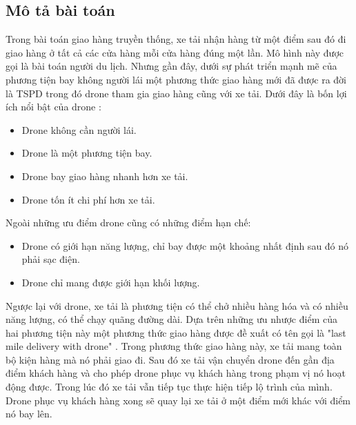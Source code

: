 \documentclass[a4paper,12pt]{report}
\begin{document}
\subsection{Mô tả bài toán}
Trong bài toán giao hàng truyền thống, xe tải nhận hàng từ một điểm sau đó đi giao hàng ở tất cả các cửa hàng mỗi cửa hàng đúng một lần. Mô hình này được gọi là bài toán người du lịch. Nhưng gần đây, dưới sự phát triển mạnh mẽ của phương tiện bay không người lái một phương thức giao hàng mới đã được ra đời là \ac{TSPD} trong đó drone tham gia giao hàng cũng với xe tải. Dưới đây là bốn lợi ích nổi bật của drone \cite{main} :
\begin{itemize}
\item Drone không cần người lái.
\item Drone là một phương tiện bay.
\item Drone bay giao hàng nhanh hơn xe tải.
\item Drone tốn ít chi phí hơn xe tải.
\end{itemize}

Ngoài những ưu điểm drone cũng có những điểm hạn chế:

\begin{itemize}
\item Drone có giới hạn năng lượng, chỉ bay được một khoảng nhất định sau đó nó phải sạc điện.
\item Drone chỉ mang được giới hạn khối lượng.
\end{itemize}

Ngược lại với drone, xe tải là phương tiện có thể chở nhiều hàng hóa và có nhiều năng lượng, có thể chạy quãng đường dài. Dựa trên những ưu nhược điểm của hai phương tiện này một phương thức giao hàng được đề xuất có tên gọi là "last mile delivery with drone" \cite{bahiwww}. Trong phương thức giao hàng này, xe tải mang toàn bộ kiện hàng mà nó phải giao đi. Sau đó xe tải vận chuyển drone đến gần địa điểm khách hàng và cho phép drone phục vụ khách hàng trong phạm vị nó hoạt động được. Trong lúc đó xe tải vẫn tiếp tục thực hiện tiếp lộ trình của mình.  Drone phục vụ khách hàng xong sẽ quay lại xe tải ở một điểm mới khác với điểm nó bay lên. \\
\end{document}
